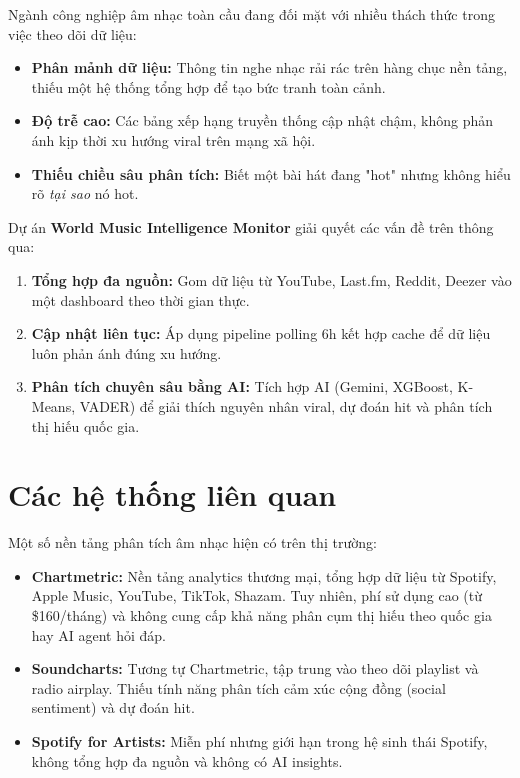 \documentclass[12pt,a4paper]{report}
\begin{document}
Ngành công nghiệp âm nhạc toàn cầu đang đối mặt với nhiều thách thức trong việc theo dõi dữ liệu:
\begin{itemize}[leftmargin=*]
    \item \textbf{Phân mảnh dữ liệu:} Thông tin nghe nhạc rải rác trên hàng chục nền tảng, thiếu một hệ thống tổng hợp để tạo bức tranh toàn cảnh.
    \item \textbf{Độ trễ cao:} Các bảng xếp hạng truyền thống cập nhật chậm, không phản ánh kịp thời xu hướng viral trên mạng xã hội.
    \item \textbf{Thiếu chiều sâu phân tích:} Biết một bài hát đang "hot" nhưng không hiểu rõ \textit{tại sao} nó hot.
\end{itemize}

Dự án \textbf{World Music Intelligence Monitor} giải quyết các vấn đề trên thông qua:
\begin{enumerate}[leftmargin=*]
    \item \textbf{Tổng hợp đa nguồn:} Gom dữ liệu từ YouTube, Last.fm, Reddit, Deezer vào một dashboard theo thời gian thực.
    \item \textbf{Cập nhật liên tục:} Áp dụng pipeline polling 6h kết hợp cache để dữ liệu luôn phản ánh đúng xu hướng.
    \item \textbf{Phân tích chuyên sâu bằng AI:} Tích hợp AI (Gemini, XGBoost, K-Means, VADER) để giải thích nguyên nhân viral, dự đoán hit và phân tích thị hiếu quốc gia.
\end{enumerate}

\section{Các hệ thống liên quan}

Một số nền tảng phân tích âm nhạc hiện có trên thị trường:
\begin{itemize}
    \item \textbf{Chartmetric:} Nền tảng analytics thương mại, tổng hợp dữ liệu từ Spotify, Apple Music, YouTube, TikTok, Shazam. Tuy nhiên, phí sử dụng cao (từ \$160/tháng) và không cung cấp khả năng phân cụm thị hiếu theo quốc gia hay AI agent hỏi đáp.
    \item \textbf{Soundcharts:} Tương tự Chartmetric, tập trung vào theo dõi playlist và radio airplay. Thiếu tính năng phân tích cảm xúc cộng đồng (social sentiment) và dự đoán hit.
    \item \textbf{Spotify for Artists:} Miễn phí nhưng giới hạn trong hệ sinh thái Spotify, không tổng hợp đa nguồn và không có AI insights.
\end{itemize}
\end{document}
